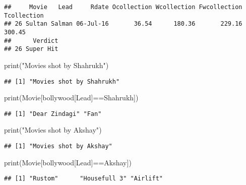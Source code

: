 \documentclass[
]{article}
\newenvironment{Shaded}{\begin{snugshade}}{\end{snugshade}}
\newcommand{\FunctionTok}[1]{\textcolor[rgb]{0.00,0.00,0.00}{#1}}
\newcommand{\NormalTok}[1]{#1}
\newcommand{\SpecialCharTok}[1]{\textcolor[rgb]{0.00,0.00,0.00}{#1}}
\newcommand{\StringTok}[1]{\textcolor[rgb]{0.31,0.60,0.02}{#1}}
\begin{document}
\begin{verbatim}
##     Movie   Lead     Rdate Ocollection Wcollection Fwcollection Tcollection
## 26 Sultan Salman 06-Jul-16       36.54      180.36       229.16      300.45
##      Verdict
## 26 Super Hit
\end{verbatim}

\begin{Shaded}
\begin{Highlighting}[]
\FunctionTok{print}\NormalTok{(}\StringTok{"Movies shot by Shahrukh"}\NormalTok{)}
\end{Highlighting}
\end{Shaded}

\begin{verbatim}
## [1] "Movies shot by Shahrukh"
\end{verbatim}

\begin{Shaded}
\begin{Highlighting}[]
\FunctionTok{print}\NormalTok{(Movie[bollywood[}\StringTok{\textquotesingle{}Lead\textquotesingle{}}\NormalTok{]}\SpecialCharTok{==}\StringTok{\textquotesingle{}Shahrukh\textquotesingle{}}\NormalTok{])}
\end{Highlighting}
\end{Shaded}

\begin{verbatim}
## [1] "Dear Zindagi" "Fan"
\end{verbatim}

\begin{Shaded}
\begin{Highlighting}[]
\FunctionTok{print}\NormalTok{(}\StringTok{"Movies shot by Akshay"}\NormalTok{)}
\end{Highlighting}
\end{Shaded}

\begin{verbatim}
## [1] "Movies shot by Akshay"
\end{verbatim}

\begin{Shaded}
\begin{Highlighting}[]
\FunctionTok{print}\NormalTok{(Movie[bollywood[}\StringTok{\textquotesingle{}Lead\textquotesingle{}}\NormalTok{]}\SpecialCharTok{==}\StringTok{\textquotesingle{}Akshay\textquotesingle{}}\NormalTok{])}
\end{Highlighting}
\end{Shaded}

\begin{verbatim}
## [1] "Rustom"      "Housefull 3" "Airlift"
\end{verbatim}
\end{document}
